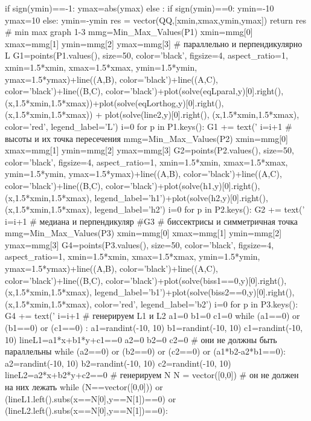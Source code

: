 \documentclass[a4paper, 12pt]{article}
\begin{document}
\begin{sagesilent}
       if sign(ymin)==-1:
          ymax=abs(ymax)
       else :
          if sign(ymin)==0:
             ymin=-10
             ymax=10
          else:
             ymin=-ymin  
    res = vector(QQ,[xmin,xmax,ymin,ymax])
    return res
# min max graph 1-3
mmg=Min_Max_Values(P1)
xmin=mmg[0]
xmax=mmg[1]
ymin=mmg[2]
ymax=mmg[3]
# параллельно и перпендикулярно L
G1=points(P1.values(), size=50, color='black', figsize=4, aspect_ratio=1, xmin=1.5*xmin, xmax=1.5*xmax, ymin=1.5*ymin, ymax=1.5*ymax)+line((A,B), color='black')+line((A,C), color='black')+line((B,C), color='black')+plot(solve(eqLparal,y)[0].right(), (x,1.5*xmin,1.5*xmax))+plot(solve(eqLorthog,y)[0].right(), (x,1.5*xmin,1.5*xmax)) + plot(solve(line2,y)[0].right(), (x,1.5*xmin,1.5*xmax), color='red', legend_label='L')
i=0
for p in P1.keys():
  G1 += text('  %
  i=i+1
# высоты и их точка пересечения
mmg=Min_Max_Values(P2)
xmin=mmg[0]
xmax=mmg[1]
ymin=mmg[2]
ymax=mmg[3]
G2=points(P2.values(), size=50, color='black', figsize=4, aspect_ratio=1, xmin=1.5*xmin, xmax=1.5*xmax, ymin=1.5*ymin, ymax=1.5*ymax)+line((A,B), color='black')+line((A,C), color='black')+line((B,C), color='black')+plot(solve(h1,y)[0].right(), (x,1.5*xmin,1.5*xmax), legend_label='h1')+plot(solve(h2,y)[0].right(), (x,1.5*xmin,1.5*xmax), legend_label='h2')
i=0
for p in P2.keys():
  G2 += text('  %
  i=i+1
# медиана и перпендикуляр
#G3
# биссектрисы и симметричная точка
mmg=Min_Max_Values(P3)
xmin=mmg[0]
xmax=mmg[1]
ymin=mmg[2]
ymax=mmg[3]
G4=points(P3.values(), size=50, color='black', figsize=4, aspect_ratio=1, xmin=1.5*xmin, xmax=1.5*xmax, ymin=1.5*ymin, ymax=1.5*ymax)+line((A,B), color='black')+line((A,C), color='black')+line((B,C), color='black')+plot(solve(biss1==0,y)[0].right(), (x,1.5*xmin,1.5*xmax), legend_label='b1')+plot(solve(biss2==0,y)[0].right(), (x,1.5*xmin,1.5*xmax), color='red', legend_label='b2')
i=0
for p in P3.keys():
 G4 += text('  %
 i=i+1
 # генерируем L1 и L2
a1=0
b1=0
c1=0
while (a1==0) or (b1==0) or (c1==0) :
  a1=randint(-10, 10)
  b1=randint(-10, 10)
  c1=randint(-10, 10)
lineL1=a1*x+b1*y+c1==0
a2=0
b2=0
c2=0
# они не должны быть параллельны
while (a2==0) or (b2==0) or (c2==0) or (a1*b2-a2*b1==0):
  a2=randint(-10, 10)
  b2=randint(-10, 10)
  c2=randint(-10, 10)
lineL2=a2*x+b2*y+c2==0
# генерируем N
N = vector([0,0])
# он не должен на них лежать
while (N==vector([0,0])) or (lineL1.left().subs(x==N[0],y==N[1])==0) or (lineL2.left().subs(x==N[0],y==N[1])==0):

\end{sagesilent}
\end{document}
